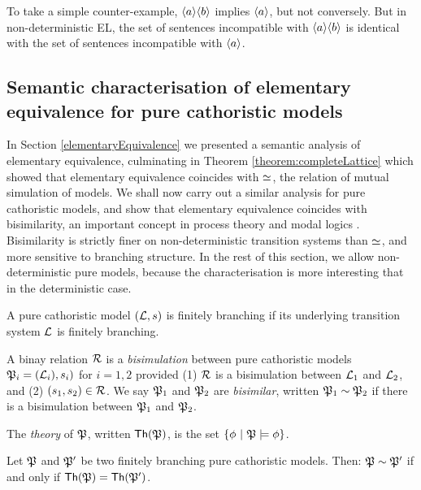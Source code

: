\NI To take a simple counter-example, $\MAY{a}\MAY{b}$ implies $\MAY{a}$,
but not conversely.  But in non-deterministic EL, the set of sentences
incompatible with $\MAY{a}\MAY{b}$ is identical with the set of
sentences incompatible with $\MAY{a}$.

\subsection{Semantic characterisation of elementary equivalence for 
pure cathoristic models}

In Section \ref{elementaryEquivalence} we presented a semantic
analysis of elementary equivalence, culminating in Theorem
\ref{theorem:completeLattice} which showed that elementary equivalence
coincides with $\simeq$, the relation of mutual simulation of
models. We shall now carry out a similar analysis for pure cathoristic
models, and show that elementary equivalence coincides with
bisimilarity, an important concept in process theory and modal logics
\cite{SangiorgiD:intbisac}. Bisimilarity is strictly finer on
non-deterministic transition systems than $\simeq$, and more
sensitive to branching structure.  In the rest of this section, we
allow non-deterministic pure models, because the characterisation is
more interesting that in the deterministic case.

\begin{definition}
A pure cathoristic model $(\mathcal{L}, s)$ is finitely branching if its
underlying transition system $\mathcal{L}$ is finitely branching.
\end{definition}

\begin{definition}
A binay relation $\mathcal{R}$ is a \emph{bisimulation} between pure cathoristic
models $\frak{P}_i = (\mathcal{L}_i), s_i)$ for $i = 1, 2$ provided (1) $\mathcal{R}$ is
a bisimulation between $\mathcal{L}_1$ and $\mathcal{L}_2$, and (2) $(s_1, s_2) \in
\mathcal{R}$. We say $\frak{P}_1$ and $\frak{P}_2$ are \emph{bisimilar}, written
$\frak{P}_1 \sim \frak{P}_2$ if there is a bisimulation between $\frak{P}_1$ and
$\frak{P}_2$.
\end{definition}

\begin{definition}
The \emph{theory} of $\frak{P}$, written $\mathsf{Th}(\frak{P})$, is the set
$\{\phi\ |\ \frak{P} \models \phi\}$.
\end{definition}

\begin{theorem}
\label{hennessymilnertheorem}
Let $\frak{P}$ and $\frak{P}'$ be two finitely branching pure cathoristic
models. Then: $\frak{P} \sim \frak{P}'$ if and only if $\mathsf{Th}(\frak{P}) =
\mathsf{Th}(\frak{P}')$. 
\end{theorem}

